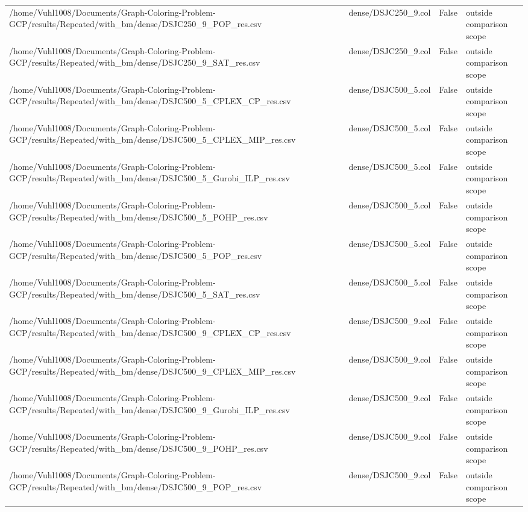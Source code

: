 \begin{table}[htbp]
\begin{tabular}{llll}
/home/Vuhl1008/Documents/Graph-Coloring-Problem-GCP/results/Repeated/with\_bm/dense/DSJC250\_9\_POP\_res.csv & dense/DSJC250\_9.col & False & outside comparison scope \\
/home/Vuhl1008/Documents/Graph-Coloring-Problem-GCP/results/Repeated/with\_bm/dense/DSJC250\_9\_SAT\_res.csv & dense/DSJC250\_9.col & False & outside comparison scope \\
/home/Vuhl1008/Documents/Graph-Coloring-Problem-GCP/results/Repeated/with\_bm/dense/DSJC500\_5\_CPLEX\_CP\_res.csv & dense/DSJC500\_5.col & False & outside comparison scope \\
/home/Vuhl1008/Documents/Graph-Coloring-Problem-GCP/results/Repeated/with\_bm/dense/DSJC500\_5\_CPLEX\_MIP\_res.csv & dense/DSJC500\_5.col & False & outside comparison scope \\
/home/Vuhl1008/Documents/Graph-Coloring-Problem-GCP/results/Repeated/with\_bm/dense/DSJC500\_5\_Gurobi\_ILP\_res.csv & dense/DSJC500\_5.col & False & outside comparison scope \\
/home/Vuhl1008/Documents/Graph-Coloring-Problem-GCP/results/Repeated/with\_bm/dense/DSJC500\_5\_POHP\_res.csv & dense/DSJC500\_5.col & False & outside comparison scope \\
/home/Vuhl1008/Documents/Graph-Coloring-Problem-GCP/results/Repeated/with\_bm/dense/DSJC500\_5\_POP\_res.csv & dense/DSJC500\_5.col & False & outside comparison scope \\
/home/Vuhl1008/Documents/Graph-Coloring-Problem-GCP/results/Repeated/with\_bm/dense/DSJC500\_5\_SAT\_res.csv & dense/DSJC500\_5.col & False & outside comparison scope \\
/home/Vuhl1008/Documents/Graph-Coloring-Problem-GCP/results/Repeated/with\_bm/dense/DSJC500\_9\_CPLEX\_CP\_res.csv & dense/DSJC500\_9.col & False & outside comparison scope \\
/home/Vuhl1008/Documents/Graph-Coloring-Problem-GCP/results/Repeated/with\_bm/dense/DSJC500\_9\_CPLEX\_MIP\_res.csv & dense/DSJC500\_9.col & False & outside comparison scope \\
/home/Vuhl1008/Documents/Graph-Coloring-Problem-GCP/results/Repeated/with\_bm/dense/DSJC500\_9\_Gurobi\_ILP\_res.csv & dense/DSJC500\_9.col & False & outside comparison scope \\
/home/Vuhl1008/Documents/Graph-Coloring-Problem-GCP/results/Repeated/with\_bm/dense/DSJC500\_9\_POHP\_res.csv & dense/DSJC500\_9.col & False & outside comparison scope \\
/home/Vuhl1008/Documents/Graph-Coloring-Problem-GCP/results/Repeated/with\_bm/dense/DSJC500\_9\_POP\_res.csv & dense/DSJC500\_9.col & False & outside comparison scope \\

\end{tabular}
\end{table}
